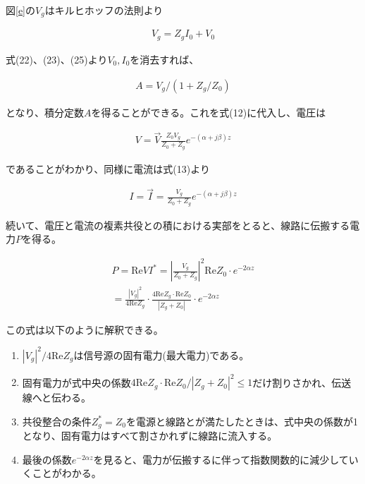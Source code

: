\documentclass[7pt,uplatex,dvipdfmx,twocolumn]{jsarticle}
\begin{document}
図\ref{e}の$V_g$はキルヒホッフの法則より

\begin{align}
V_g=Z_gI_{0}+V_0
\end{align}

式(22)、(23)、(25)より$V_0,I_0$を消去すれば、

\begin{align}
A=V_g/\left(  1+Z_g/Z_0 \right)
\end{align}

となり、積分定数$A$を得ることができる。これを式(12)に代入し、電圧は

\begin{align}
V=\overrightarrow{V}\frac{Z_0V_g}{Z_0+Z_g}e^{-\left(   \alpha +j\beta\right)z}
\end{align}

であることがわかり、同様に電流は式(13)より

\begin{align}
I=\overrightarrow{I}=\frac{V_g}{Z_0+Z_g}e^{-\left(   \alpha +j\beta\right)z}
\end{align}

続いて、電圧と電流の複素共役との積における実部をとると、線路に伝搬する電力$P$を得る。

\begin{align}
  P=\mathrm{Re}VI^*=\left\lvert \frac{V_g}{Z_0+Z_g}\right\rvert ^2\mathrm{Re}Z_0\cdot e^{-2\alpha z}\\
  =\frac{\left\lvert V_g\right\rvert^2 }{4\mathrm{Re}Z_g}\cdot \frac{4\mathrm{Re}Z_g\cdot\mathrm{Re}Z_0}{\left\lvert Z_g+Z_0\right\rvert }\cdot e^{-2\alpha z}
  \end{align}

  この式は以下のように解釈できる。

  \begin{enumerate}
  \item $\left\lvert V_g\right\rvert ^2/4\mathrm{Re}Z_g$は信号源の固有電力(最大電力)である。
  \item 固有電力が式中央の係数$4\mathrm{Re}Z_g\cdot \mathrm{Re}Z_0/\left\lvert Z_g+Z_0\right\rvert^2 \leq 1$だけ割りさかれ、伝送線へと伝わる。
  \item 共役整合の条件$Z_g^*=Z_0$を電源と線路とが満たしたときは、式中央の係数が1となり、固有電力はすべて割さかれずに線路に流入する。
  \item 最後の係数$e^{-2\alpha z}$を見ると、電力が伝搬するに伴って指数関数的に減少していくことがわかる。
  \end{enumerate}
  
\end{document}
